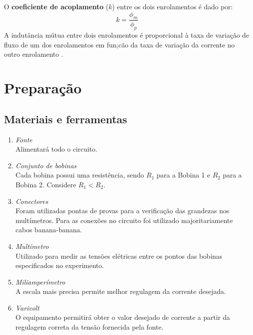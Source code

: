 \documentclass[a4paper,12pt,oneside,openany,table,xcdraw]{article}
\begin{document}
O \textbf{coeficiente de acoplamento} ($k$) entre os dois enrolamentos é dado por:
$$k = \dfrac{\phi_m}{\phi_p}$$
A indutância mútua entre dois enrolamentos é proporcional à taxa de variação de fluxo de um dos enrolamentos em fun;cão da taxa de variação da corrente no outro enrolamento  \cite{boylestad}.

\section{Preparação}
\subsection{Materiais e ferramentas} %
\begin{enumerate}[1 - ]
\item \emph{Fonte}\\
Alimentará todo o circuito.

\item \emph{Conjunto de bobinas}\\
Cada bobina possui uma resistência, sendo $R_1$ para a Bobina 1 e $R_2$ para a Bobina 2. Considere $R_1<R_2$.

\item \emph{Conectores}\\
Foram utilizadas pontas de provas para a verificação das grandezas nos multímetros. Para as conexões no circuito foi utilizado majoritariamente cabos banana-banana.

\item \emph{Multímetro}\\
Utilizado para medir as tensões elétricas entre os pontos das bobinas especificados no experimento.

\item \emph{Miliamperímetro}\\
A escala mais precisa permite melhor regulagem da corrente desejada.

\item \emph{Varivolt}\\
O equipamento permitirá obter o valor desejado de corrente a partir da regulagem correta da tensão fornecida pela fonte.


\end{enumerate}
\end{document}

